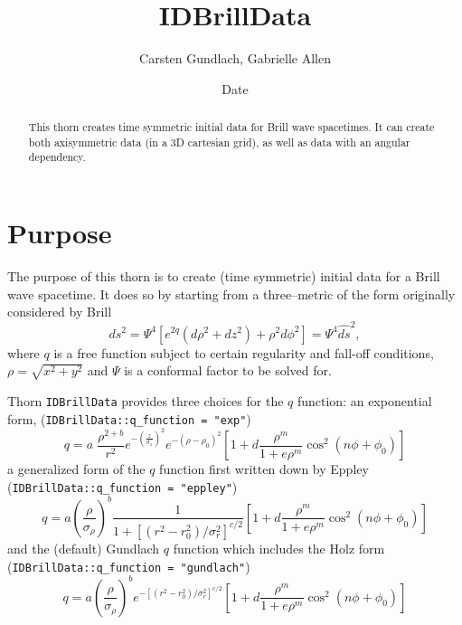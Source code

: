 \documentclass{article}
\begin{document}
\title{IDBrillData}
\author{Carsten Gundlach, Gabrielle Allen}
\date{$ $Date$ $}

\maketitle


\begin{abstract}
This thorn creates time symmetric initial data for Brill
wave spacetimes.  It can create both axisymmetric data (in a 3D
cartesian grid), as well as data with an angular dependency.
\end{abstract}

\section{Purpose}

The purpose of this thorn is to create (time symmetric) initial data
for a Brill wave spacetime.  It does so by starting from a
three--metric of the form originally considered by Brill
\begin{equation}
ds^2 = \Psi^4 \left[ e^{2q} \left( d\rho^2 + dz^2 \right)
+ \rho^2 d\phi^2 \right] =\Psi^4 \hat{ds}^{2},
\label{eqn:brillmetric}
\end{equation}
where $q$ is a free function subject to certain regularity and
fall-off conditions, $\rho=\sqrt{x^2+y^2}$ and $\Psi$ is a conformal
factor to be solved for.

Thorn {\tt IDBrillData} provides three choices for the $q$ function: 
an exponential form, ({\tt IDBrillData::q\_function = "exp"})
\begin{equation}
q = a \; \frac{\rho^{2+b}}{r^2} e^{-\left( \frac{z}{\sigma_z} \right)^2}
e^{-(\rho - \rho_0)^2} \left[ 1 + d \frac{\rho^m}{1 + e \rho^m}
\cos^2 \left( n \phi + \phi_0 \right) \right]
\end{equation}
a generalized form of the $q$ function first written down by Eppley
({\tt IDBrillData::q\_function = "eppley"}) 
\begin{equation}
q = a \left( \frac{\rho}{\sigma_\rho} \right)^b \frac{1}{1 + \left[
\left( r^2 - r_0^2 \right) / \sigma_r^2 \right]^{c/2}}\left[ 1 + d \frac{\rho^m}{1 + e \rho^m}
\cos^2 \left( n \phi + \phi_0 \right) \right]
\end{equation}
and the (default) Gundlach $q$ function which includes the Holz form
({\tt IDBrillData::q\_function = "gundlach"})
\begin{equation} 
q = a \left( \frac{\rho}{\sigma_\rho} \right)^b e^{-\left[
\left( r^2 - r_0^2 \right) / \sigma_r^2 \right]^{c/2}} \left[ 1 + d \frac{\rho^m}{1 + e \rho^m}
\cos^2 \left( n \phi + \phi_0 \right) \right]
\end{equation}
\end{document}

